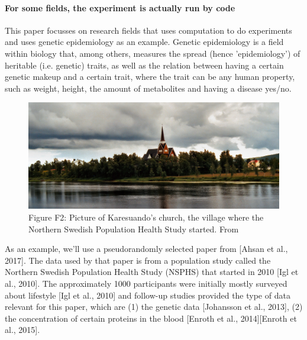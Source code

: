 \paragraph{For some fields, the experiment is actually run by code}

This paper focusses on research fields that uses computation
to do experiments and uses genetic epidemiology as an example.
Genetic epidemiology is a field within biology that, among 
others, measures the spread (hence 'epidemiology') 
of heritable (i.e. genetic) traits, as well as the relation
between having a certain genetic makeup and a certain trait,
where the trait can be any human property, such as weight, height,
the amount of metabolites and having a disease yes/no.

\begin{figure}[!htbp]
  \centering
  \includegraphics[width=\linewidth]{Karesuando_church.jpg}
  \caption{
    Figure F2: Picture of Karesuando's church,
    the village where the Northern Swedish Population
    Health Study started.
    From \cite{hopfner2005}
  }
  \label{fig:karesuando_church}
\end{figure}

As an example, we'll use a pseudorandomly selected paper
from [Ahsan et al., 2017]. The data used by that paper is
from a population study called the Northern Swedish Population
Health Study (NSPHS) that started in 2010 [Igl et al., 2010]. 
The approximately 1000 participants were initially mostly surveyed
about lifestyle [Igl et al., 2010] and follow-up studies
provided the type of data relevant for this paper, 
which are (1) the genetic data [Johansson et al., 2013],
(2) the concentration of certain proteins in the 
blood [Enroth et al., 2014][Enroth et al., 2015].

